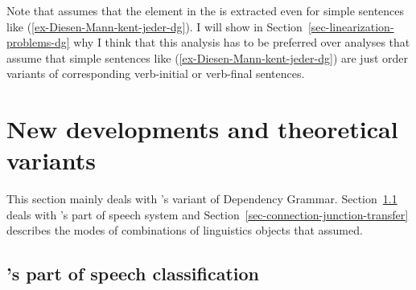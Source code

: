 Note that \citet[]{Hudson97a} assumes that the element in the \vf is extracted even for simple
sentences like (\ref{ex-Diesen-Mann-kent-jeder-dg}). I will show in Section~\ref{sec-linearization-problems-dg} why I think that
this analysis has to be preferred over analyses that assume that simple sentences like
(\ref{ex-Diesen-Mann-kent-jeder-dg}) are just order variants of corresponding verb-initial or
verb-final sentences.


\section{New developments and theoretical variants}

This section mainly deals with \tes's variant of Dependency Grammar. Section~\ref{sec-tesniere-pos}
deals with \tes's part of speech system and Section~\ref{sec-connection-junction-transfer} describes the modes of combinations of
linguistics objects that \tes assumed.

\subsection{\tes's part of speech classification}
\label{sec-tesniere-pos}

